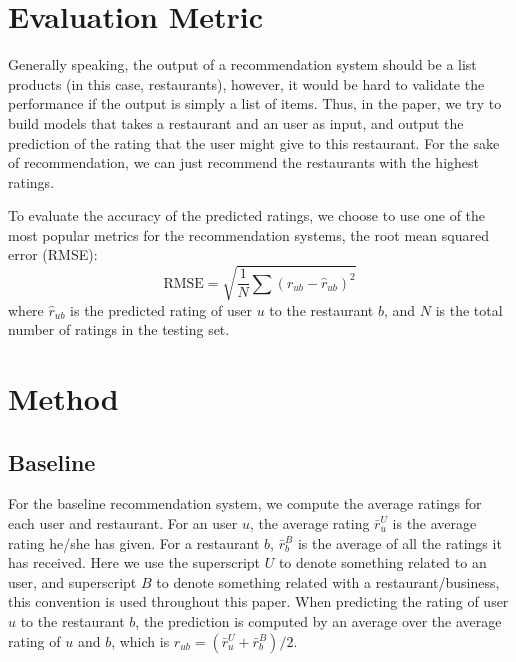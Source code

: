 \documentclass[conference]{IEEEtran}
\begin{document}
\section{Evaluation Metric}
Generally speaking, the output of a recommendation system should be a list products (in this case, 
restaurants), however, it would be hard to validate the performance
if the output is simply a list of items. Thus, in the paper, we try to
build models that takes a restaurant and an user as input, and output the 
prediction of the rating that the user might give to this restaurant. 
For the sake of recommendation, we can just recommend the restaurants
with the highest ratings.
\par
To evaluate the accuracy of the predicted ratings, we choose to use one of the most popular metrics for the recommendation systems\cite{rmse}, the 
root mean squared error (RMSE):
\[
\text{RMSE} = \sqrt{\frac{1}{N}\sum\left(r_{ub} - \hat{r}_{ub}\right)^2}
\]
where $\hat{r}_{ub}$ is the predicted rating of user $u$ to the restaurant $b$,
and $N$ is the total number of ratings in the testing set.


\section{Method}

\subsection{Baseline}
For the baseline recommendation system, we compute the average ratings 
for each user and restaurant. For an user $u$, the average rating $\bar{r}^U_u$ is
the average rating he/she has given. For 
a restaurant $b$, $\bar{r}^B_b$ is the average of all the ratings it has received. 
Here we use the superscript $U$ to denote something related
to an user, and superscript $B$ to denote something related with 
a restaurant/business, this convention is used throughout this paper. When predicting the rating of user $u$ to the
restaurant $b$, the prediction is computed by an average over the average
rating of $u$ and $b$, which is $\hat{r}_{ub} = (\bar{r}^U_u + \bar{r}^B_b)/2$.
\end{document}
